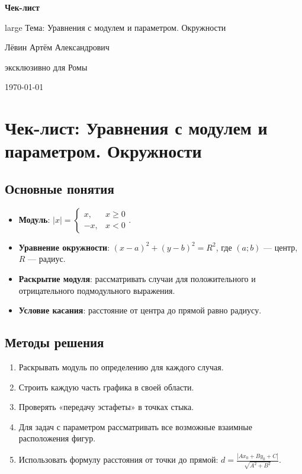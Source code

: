 \documentclass[a4paper,12pt]{article}
\begin{document}
\begin{titlepage}
\centering
\vspace*{2cm}
{\Large\bfseries\color{darkaccent} Чек-лист}\par
\vspace{0.5cm}
{{large Тема: Уравнения с модулем и параметром. Окружности}}\par
\vspace{2cm}
{\large Лёвин Артём Александрович}\par
{\large эксклюзивно для Ромы}\par
\vspace{2cm}
{\today}\par
\vfill
{}
\vspace{1cm}
\end{titlepage}

\section*{Чек-лист: Уравнения с модулем и параметром. Окружности}

\subsection*{Основные понятия}
\begin{itemize}[leftmargin=*]
\item \textbf{Модуль}: $|x| = \begin{cases} x, & x \geq 0 \\ -x, & x < 0 \end{cases}$.
\item \textbf{Уравнение окружности}: $(x-a)^2 + (y-b)^2 = R^2$, где $(a;b)$ --- центр, $R$ --- радиус.
\item \textbf{Раскрытие модуля}: рассматривать случаи для положительного и отрицательного подмодульного выражения.
\item \textbf{Условие касания}: расстояние от центра до прямой равно радиусу.
\end{itemize}

\subsection*{Методы решения}
\begin{enumerate}[leftmargin=*]
\item Раскрывать модуль по определению для каждого случая.
\item Строить каждую часть графика в своей области.
\item Проверять «передачу эстафеты» в точках стыка.
\item Для задач с параметром рассматривать все возможные взаимные расположения фигур.
\item Использовать формулу расстояния от точки до прямой: $d = \frac{|Ax_0 + By_0 + C|}{\sqrt{A^2+B^2}}$.
\end{enumerate}
\end{document}
